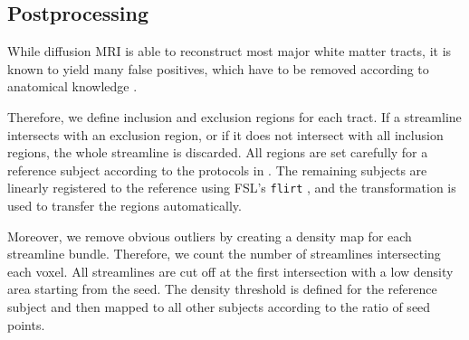 \subsection{Postprocessing}
\label{sec:postprocessing}
While diffusion MRI is able to reconstruct most major white
matter tracts, it is known to yield many false
positives, which have to be removed according to anatomical knowledge
\cite{MaierHein:2017}. %

Therefore, we define inclusion and exclusion regions for each tract. If a streamline intersects with an exclusion region, or if it  does not intersect with all inclusion regions, the whole streamline is discarded. All regions
are set carefully for a reference subject according to the protocols in
\cite{Wakana:2007}.
The remaining subjects are linearly registered to the reference using FSL's \texttt{flirt} \cite{FSL}, and the transformation is used to transfer the regions automatically.

Moreover, we remove obvious outliers by creating a density map for each streamline
bundle. Therefore, we count the number of streamlines intersecting each voxel.
All streamlines are cut off at the first intersection with a low density
area starting from the seed. The density threshold is defined for the
reference subject and then mapped to all other subjects according to the ratio of seed points.

